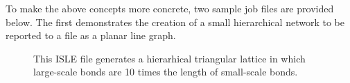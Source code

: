 \documentclass{article}
\begin{document}
To make the above concepts more concrete, two sample job files are provided
below. The first demonstrates the creation of a small hierarchical network
to be reported to a file as a planar line graph.

\begin{figure}[!htb]
\caption{This ISLE file generates a hierarhical triangular lattice in which
large-scale bonds are 10 times the length of small-scale bonds.}
\label{fig:simple_ht_isle_file}
\end{figure}
\end{document}

